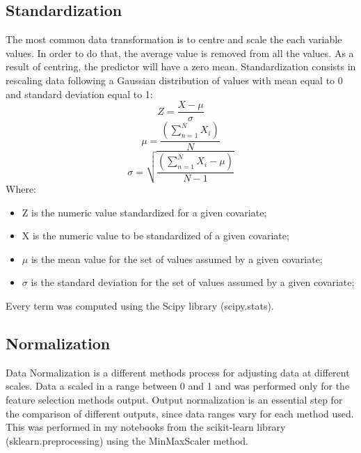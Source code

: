 \subsection{Standardization}
The most common data transformation is to centre and scale the each variable values. In order to do that, the average value is removed from all the values. As a result of centring, the predictor will have a zero mean.\cite{kuhn2013applied}
Standardization consists in rescaling data following a Gaussian distribution of values with mean equal to 0 and standard deviation equal to 1:
\begin{equation}
  Z = \frac{X-\mu}{\sigma}
\end{equation}
\begin{equation}
\mu = \frac{(\sum_{n=1}^{N} X_i)}{N}
\end{equation}
\begin{equation}
\sigma = \sqrt{\frac{(\sum_{n=1}^{N} X_i-\mu)}{N-1}}
\end{equation}
Where:
\begin{itemize}
\item Z is the numeric value standardized for a given covariate;
\item X is the numeric value to be standardized of a given covariate;
\item $\mu$ is the mean value for the set of values assumed by a given covariate;
\item $\sigma$ is the standard deviation for the set of values assumed by a given covariate;
\end{itemize}
Every term was computed using the Scipy library (scipy.stats). 
\bigbreak
\subsection{Normalization}
Data Normalization is a different methods process for adjusting data at different scales. Data a scaled in a range between 0 and 1 and was performed only for the feature selection methods output.
Output normalization is an essential step for the comparison of different outputs, since data ranges vary for each method used.\newline
This was performed in my notebooks from the scikit-learn library (sklearn.preprocessing) using the MinMaxScaler method.
